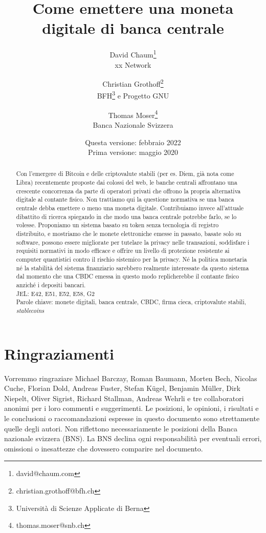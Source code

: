 \documentclass{article}
\title{Come emettere una moneta digitale di banca centrale}
\author{David Chaum\footnote{david@chaum.com} \\
  xx Network \and
  Christian Grothoff\footnote{christian.grothoff@bfh.ch} \\
  BFH\footnote{Università di Scienze Applicate di Berna}
  \quad e Progetto GNU \and
  Thomas Moser\footnote{thomas.moser@snb.ch} \\
  Banca Nazionale Svizzera}
\date{Questa versione: febbraio 2022 \\
      Prima versione:  maggio 2020}
\begin{document}
\maketitle

\begin{abstract} 
Con l'emergere di Bitcoin e delle criptovalute stabili (per es. Diem, 
già nota come Libra) recentemente proposte dai colossi del web, le 
banche centrali affrontano una crescente concorrenza da parte di 
operatori privati che offrono la propria alternativa digitale al 
contante fisico. Non trattiamo qui la questione normativa se una banca 
centrale debba emettere o meno una moneta digitale. Contribuiamo invece 
all'attuale dibattito di ricerca spiegando in che modo una banca centrale 
potrebbe farlo, se lo volesse. Proponiamo un sistema basato su token 
senza tecnologia di registro distribuito, e mostriamo che le monete  
elettroniche emesse in passato, basate solo su software, possono essere 
migliorate per tutelare la privacy nelle transazioni, soddisfare i 
requisiti normativi in modo efficace e offrire un livello di protezione 
resistente ai computer quantistici contro il rischio sistemico per 
la privacy. Né la politica monetaria né la stabilità del sistema 
finanziario sarebbero realmente interessate da questo sistema dal 
momento che una CBDC emessa in questo modo replicherebbe il contante 
fisico anziché i depositi bancari. \\

JEL: E42, E51, E52, E58, G2
\\

Parole chiave: monete digitali, banca centrale, CBDC, firma cieca, 
criptovalute stabili, \textit{stablecoins}
\end{abstract}

\vspace{40pt}

\section*{Ringraziamenti}
Vorremmo ringraziare Michael Barczay, Roman Baumann, Morten Bech, 
Nicolas Cuche, Florian Dold, Andreas Fuster, Stefan Kügel, Benjamin 
Müller, Dirk Niepelt, Oliver Sigrist, Richard Stallman, Andreas Wehrli 
e tre collaboratori anonimi per i loro commenti e suggerimenti. Le 
posizioni, le opinioni, i risultati e le conclusioni o raccomandazioni 
espresse in questo documento sono strettamente quelle degli autori. 
Non riflettono necessariamente le posizioni della Banca nazionale 
svizzera (BNS). La BNS declina ogni responsabilità per eventuali 
errori, omissioni o inesattezze che dovessero comparire nel documento.
\end{document}
